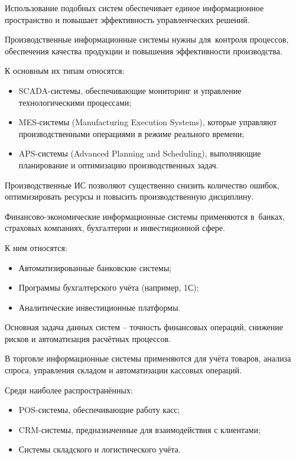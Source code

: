 \documentclass{ou}
\begin{document}
Использование подобных систем обеспечивает единое информационное пространство и повышает эффективность управленческих решений.

Производственные информационные системы нужны для~контроля процессов, обеспечения качества продукции и повышения эффективности производства.

К основным их типам относятся:
\begin{itemize}[label=-, leftmargin=0em, itemindent=3.35em, nosep]
\item SCADA-системы, обеспечивающие мониторинг и управление технологическими процессами;
\item MES-системы (Manufacturing Execution Systems), которые управляют производственными операциями в режиме реального времени;
\item APS-системы (Advanced Planning and Scheduling), выполняющие планирование и оптимизацию производственных задач.
\end{itemize}

Производственные ИС позволяют существенно снизить количество ошибок, оптимизировать ресурсы и повысить производственную дисциплину.

Финансово-экономические информационные системы применяются в~банках, страховых компаниях, бухгалтерии и инвестиционной сфере.

К ним относятся:
\begin{itemize}[label=-, leftmargin=0em, itemindent=3.35em, nosep]
\item Автоматизированные банковские системы;
\item Программы бухгалтерского учёта (например, 1С);
\item Аналитические инвестиционные платформы.
\end{itemize}

Основная задача данных систем -- точность финансовых операций, снижение рисков и автоматизация расчётных процессов.

В торговле информационные системы применяются для учёта товаров, анализа спроса, управления складом и автоматизации кассовых операций.

Среди наиболее распространённых:
\begin{itemize}[label=-, leftmargin=0em, itemindent=3.35em, nosep]
\item POS-системы, обеспечивающие работу касс;
\item CRM-системы, предназначенные для взаимодействия с клиентами;
\item Системы складского и логистического учёта.
\end{itemize}
\end{document}
